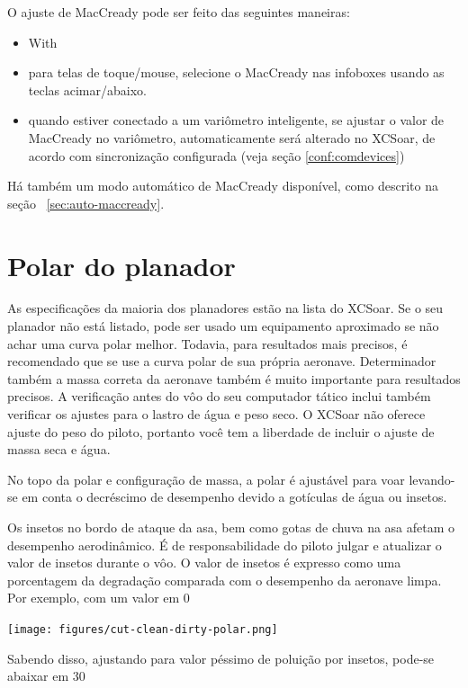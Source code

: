 O ajuste de MacCready pode ser feito das seguintes maneiras:
\begin{itemize}
\item With \blink{}
\item para telas de toque/mouse, selecione o MacCready nas infoboxes usando as teclas acimar/abaixo.
\item quando estiver conectado a um variômetro inteligente, se ajustar o valor de MacCready no variômetro, automaticamente será alterado no XCSoar, de acordo com sincronização configurada (veja seção \ref{conf:comdevices})
\end{itemize}
Há também um modo automático de MacCready disponível, como descrito na seção ~\ref{sec:auto-maccready}.


\section{Polar do planador}\label{sec:glidepolar}

As especificações da maioria dos planadores estão na lista do XCSoar.  
Se o seu planador não está listado, pode ser usado um equipamento aproximado se não achar uma curva polar melhor.  Todavia, para resultados mais precisos, é recomendado que se use a curva polar de sua própria aeronave.  Determinador também a massa correta da aeronave também é muito importante para resultados precisos.  A verificação antes do vôo do seu computador tático inclui também verificar os ajustes para o lastro de água e peso seco.    O XCSoar não oferece ajuste do peso do piloto, portanto você tem a liberdade de incluir o ajuste de massa seca e água. 

No topo da polar e configuração de massa, a polar é ajustável para voar levando-se em conta o decréscimo de desempenho devido a gotículas de água ou insetos.

Os insetos no bordo de ataque da asa, bem como gotas de chuva na asa afetam o desempenho aerodinâmico.  É de responsabilidade do piloto julgar e atualizar o valor de insetos durante o vôo.  O valor de insetos é expresso como uma porcentagem da degradação comparada com o desempenho da aeronave limpa.  Por exemplo, com um valor em 0%

\begin{center}
\texttt{[image: figures/cut-clean-dirty-polar.png]}
\end{center}
Sabendo disso, ajustando para valor péssimo de poluição por insetos, pode-se abaixar em 30%

